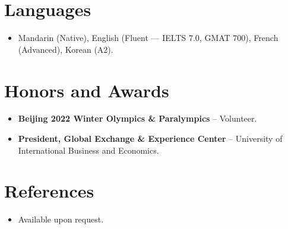 \documentclass[11pt,a4paper,sans]{moderncv}
\begin{document}
\section{Languages}
\vspace{1pt}
\begin{itemize}
\item Mandarin (Native), English (Fluent --- IELTS 7.0, GMAT 700), French (Advanced), Korean (A2).
\end{itemize}


\section{Honors and Awards}
\vspace{1pt}
\begin{itemize}
\item{\textbf{Beijing 2022 Winter Olympics \& Paralympics} -- Volunteer.}
\item{\textbf{President, Global Exchange \& Experience Center} -- University of International Business and Economics.}
\end{itemize}


\section{References}
\vspace{1pt}
\begin{itemize}
\item{Available upon request.}
\end{itemize}
\end{document}
